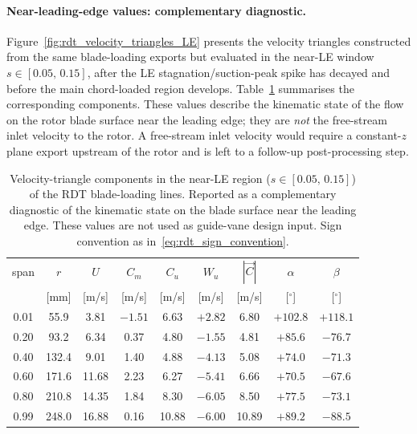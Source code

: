 \paragraph{Near-leading-edge values: complementary diagnostic.}
Figure~\ref{fig:rdt_velocity_triangles_LE} presents the velocity triangles constructed from the same blade-loading exports but evaluated in the near-LE window $s\in[0.05,\,0.15]$, after the LE stagnation/suction-peak spike has decayed and before the main chord-loaded region develops. Table~\ref{tab:rdt_le_values} summarises the corresponding components. These values describe the kinematic state of the flow on the rotor blade surface near the leading edge; they are \emph{not} the free-stream inlet velocity to the rotor. A free-stream inlet velocity would require a constant-$z$ plane export upstream of the rotor and is left to a follow-up post-processing step.
 
\begin{table}[H]
  \centering
  \caption[RDT near-LE velocity triangle at six spans]{Velocity-triangle components in the near-LE region ($s\in[0.05,\,0.15]$) of the RDT blade-loading lines. Reported as a complementary diagnostic of the kinematic state on the blade surface near the leading edge. These values are not used as guide-vane design input. Sign convention as in~\eqref{eq:rdt_sign_convention}.}
  \label{tab:rdt_le_values}
  \begin{tabular}{ccccccccc}
    \hline
    span & $r$ & $U$ & $C_m$ & $C_u$ & $W_u$ & $|\vec{C}|$ & $\alpha$ & $\beta$ \\
         & [mm] & [m/s] & [m/s] & [m/s] & [m/s] & [m/s] & [$^\circ$] & [$^\circ$] \\
    \hline
    0.01 &  55.9 &  3.81 & $-1.51$ &  6.63 & $+2.82$ &  6.80 & $+102.8$ & $+118.1$ \\
    0.20 &  93.2 &  6.34 &   0.37  &  4.80 & $-1.55$ &  4.81 &  $+85.6$ &  $-76.7$ \\
    0.40 & 132.4 &  9.01 &   1.40  &  4.88 & $-4.13$ &  5.08 &  $+74.0$ &  $-71.3$ \\
    0.60 & 171.6 & 11.68 &   2.23  &  6.27 & $-5.41$ &  6.66 &  $+70.5$ &  $-67.6$ \\
    0.80 & 210.8 & 14.35 &   1.84  &  8.30 & $-6.05$ &  8.50 &  $+77.5$ &  $-73.1$ \\
    0.99 & 248.0 & 16.88 &   0.16  & 10.88 & $-6.00$ & 10.89 &  $+89.2$ &  $-88.5$ \\
    \hline
  \end{tabular}
\end{table}
 
